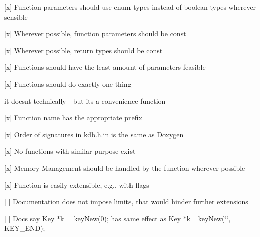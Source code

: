 \begin{DoxyItemize}
\item \mbox{[}x\mbox{]} Function parameters should use enum types instead of boolean types wherever sensible
\item \mbox{[}x\mbox{]} Wherever possible, function parameters should be {\ttfamily const}
\item \mbox{[}x\mbox{]} Wherever possible, return types should be {\ttfamily const}
\item \mbox{[}x\mbox{]} Functions should have the least amount of parameters feasible
\end{DoxyItemize}


\begin{DoxyItemize}
\item \mbox{[}x\mbox{]} Functions should do exactly one thing
\begin{DoxyItemize}
\item it doesn\textquotesingle{}t technically -\/ but its a convenience function
\end{DoxyItemize}
\item \mbox{[}x\mbox{]} Function name has the appropriate prefix
\item \mbox{[}x\mbox{]} Order of signatures in kdb.\+h.\+in is the same as Doxygen
\item \mbox{[}x\mbox{]} No functions with similar purpose exist
\end{DoxyItemize}


\begin{DoxyItemize}
\item \mbox{[}x\mbox{]} Memory Management should be handled by the function wherever possible
\end{DoxyItemize}


\begin{DoxyItemize}
\item \mbox{[}x\mbox{]} Function is easily extensible, e.\+g., with flags
\item \mbox{[} \mbox{]} Documentation does not impose limits, that would hinder further extensions
\begin{DoxyItemize}
\item \mbox{[} \mbox{]} Docs say {\ttfamily Key $\ast$k = key\+New(0);} has same effect as {\ttfamily Key $\ast$k =key\+New(\char`\"{}\char`\"{}, K\+E\+Y\+\_\+\+E\+ND);}
\end{DoxyItemize}
\end{DoxyItemize}


